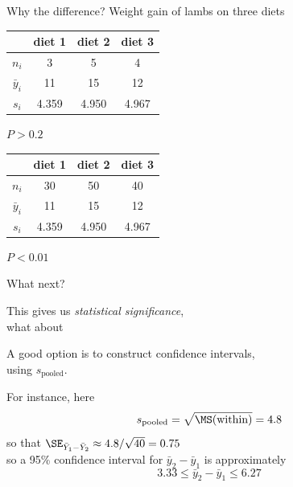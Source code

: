 \begin{frame}{Why the difference?}
    Weight gain of lambs on three diets

    \begin{center}
        \begin{tabular}{cccc}
            & diet 1 & diet 2 & diet 3 \\
            \hline
            $n_i$ & 3 & 5 & 4 \\
            $\bar y_i$ & 11 & 15 & 12 \\
            $s_i$ & 4.359 & 4.950 & 4.967 \\
        \end{tabular}
    \end{center}

    \hspace{4em}\alert{    $P>0.2$}

    \vspace{3em}

    \begin{center}
        \begin{tabular}{cccc}
            & diet 1 & diet 2 & diet 3 \\
            \hline
            $n_i$ & 30 & 50 & 40 \\
            $\bar y_i$ & 11 & 15 & 12 \\
            $s_i$ & 4.359 & 4.950 & 4.967 \\
        \end{tabular}
    \end{center}
    \hspace{4em}\alert{$P<0.01$}

    \pause



  \end{frame}

  \begin{frame}{What next?}

    This gives us \emph{statistical significance},\\
    what about 

    \vspace{2em}

    A good option is to construct \alert{confidence intervals},\\
    using $s_\text{pooled}$.

    \vspace{2em}

    For instance, here
    \[
    s_\text{pooled} = \sqrt{\MS(\text{within})} = 4.8
    \]
    so that $\SE_{\bar Y_1 - \bar Y_2} \approx 4.8 / \sqrt{40} =0.75$\\
    so a 95\% confidence interval for $\bar y_2 - \bar y_1$ is approximately\\
    \[
  3.33 \le \bar y_2 - \bar y_1 \le 6.27
  \]


  \end{frame}



